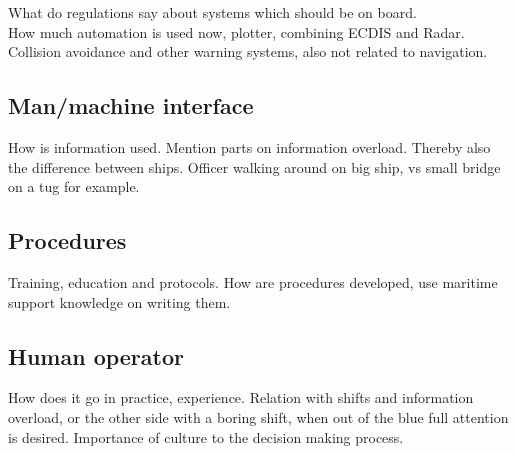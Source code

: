 What do regulations say about systems which should be on board. \\
How much automation is used now, plotter, combining ECDIS and Radar. \\
Collision avoidance and other warning systems, also not related to navigation.


\subsection{Man/machine interface}
How is information used. Mention parts on information overload. Thereby also the difference between ships. Officer walking around on big ship, vs small bridge on a tug for example.

\subsection{Procedures}
Training, education and protocols. How are procedures developed, use maritime support knowledge on writing them.

\subsection{Human operator}
How does it go in practice, experience. Relation with shifts and information overload, or the other side with a boring shift, when out of the blue full attention is desired. Importance of culture to the decision making process.
